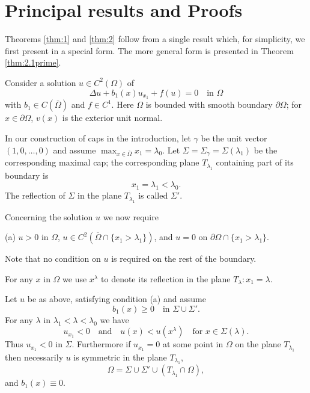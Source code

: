 \section{Principal results and Proofs}\label{sec:2}

\setcounter{theorem}{0}

Theorems \ref{thm:1} and \ref{thm:2} follow from a single result which,
for simplicity, we first present in a special form. The more general form is presented in
Theorem \ref{thm:2.1prime}.

Consider a solution $u\in C^2(\Omega)$ of
\begin{equation}\label{eq:2.1}
  \Delta u + b_1(x)u_{x_1} + f(u) = 0 \quad \text{in } \Omega
\end{equation}
with $b_1\in C(\overline{\Omega})$ and $f\in C^1$.
Here $\Omega$ is bounded with smooth boundary $\partial\Omega$;
for $x\in\partial\Omega$, $v(x)$ is the exterior unit normal.

In our construction of caps in the introduction, let $\gamma$ be the unit vector
$(1,0,\ldots,0)$ and assume $\max_{x\in\overline{\Omega}} x_1 = \lambda_0$.
Let $\Sigma = \Sigma_\gamma = \Sigma(\lambda_1)$ be the corresponding maximal cap;
the corresponding plane $T_{\lambda_1}$ containing part of its boundary is
\[x_1 = \lambda_1 < \lambda_0.\]
The reflection of $\Sigma$ in the plane $T_{\lambda_1}$ is called $\Sigma'$.

Concerning the solution $u$ we now require

(a) $u>0$ in $\Omega$, $u\in C^2(\overline{\Omega}\cap\{x_1>\lambda_1\})$,
and $u=0$ on $\partial\Omega\cap\{x_1>\lambda_1\}$.

Note that no condition on $u$ is required on the rest of the boundary.

For any $x$ in $\Omega$ we use $x^\lambda$ to denote its reflection in the plane
$T_\lambda : x_1=\lambda$.

\begin{theorem}\label{thm:2.1}
  Let $u$ be as above, satisfying condition (a) and assume
  \[b_1(x) \geq 0 \quad \text{in } \Sigma\cup\Sigma'.\]
  For any $\lambda$ in $\lambda_1 < \lambda < \lambda_0$ we have
  \begin{equation}\label{eq:2.2}
    u_{x_1} < 0\quad \text{and} \quad u(x) < u(x^\lambda) \quad \text{for } x\in \Sigma(\lambda).
  \end{equation}
  Thus $u_{x_1}<0$ in $\Sigma$. Furthermore if $u_{x_1} = 0$
  at some point in $\Omega$ on the plane $T_{\lambda_1}$
  then necessarily $u$ is symmetric in the plane $T_{\lambda_1}$,
  \begin{equation}\label{eq:2.3}
    \Omega = \Sigma\cup\Sigma'\cup(T_{\lambda_1}\cap\Omega),
  \end{equation}
  and $b_1(x)\equiv 0$.
\end{theorem}

